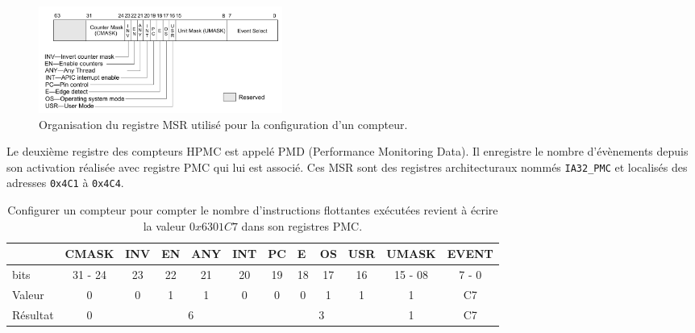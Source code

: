             \begin{figure}
            \center
            \includegraphics[width=8cm]{images/eld_perf_pmc.png}
            \caption{\label{pic:eld_perf_pmc}Organisation du registre MSR utilisé pour la configuration d'un compteur.}
            \end{figure}
            
            
            Le deuxième registre des compteurs HPMC est appelé PMD (Performance Monitoring Data). Il enregistre le nombre d'évènements depuis son activation réalisée avec registre PMC qui lui est associé. Ces MSR sont des registres architecturaux nommés \verb|IA32_PMC| et localisés des adresses \verb|0x4C1| à \verb|0x4C4|.
           
            
            \begin{table}[]
            \centering
            \begin{tabular}{l|c|c|c|c|c|c|c|c|c|c|c|}
            \cline{2-12}
            & \multicolumn{1}{l|}{CMASK} & \multicolumn{1}{l|}{INV} & \multicolumn{1}{l|}{EN} & \multicolumn{1}{l|}{ANY} & \multicolumn{1}{l|}{INT} & \multicolumn{1}{l|}{PC} & \multicolumn{1}{l|}{E} & \multicolumn{1}{l|}{OS} & \multicolumn{1}{l|}{USR} & \multicolumn{1}{l|}{UMASK} & \multicolumn{1}{l|}{EVENT} \\ \hline
            \multicolumn{1}{|l|}{bits} & 31 - 24 & 23 & 22 & 21 & 20 & 19 & 18 & 17 & 16 & 15 - 08 & 7 - 0 \\ \hline
            \multicolumn{1}{|l|}{Valeur} & 0 & 0 & 1 & 1 & 0 & 0 & 0 & 1 & 1 & 1 & C7 \\ \hline
            \multicolumn{1}{|l|}{Résultat} & 0 & \multicolumn{4}{c|}{6} & \multicolumn{4}{c|}{3} & 1 & C7 \\ \hline
            \end{tabular}%
            \caption{Configurer un compteur pour compter le nombre d'instructions flottantes exécutées revient à écrire la valeur $0x6301C7$ dans son registres PMC.}
            \label{tab:pmc_config}
            \end{table}
        
